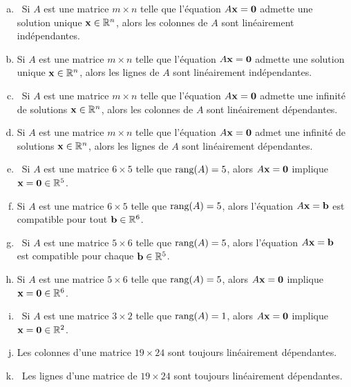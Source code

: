 \begin{prob}
\begin{enumerate}[a)]
\item\sov~Si $A$ est une matrice $m \times n$ telle que l'équation $A\mathbf{x}=\mathbf{0}$ admette une solution unique $\mathbf{x}\in \mathbb{R}^n$, alors les colonnes de $A$ sont linéairement indépendantes.
 
\medskip
\item Si $A$ est une matrice $m \times n$ telle que l'équation $A\mathbf{x}=\mathbf{0}$ admette une solution unique $\mathbf{x}\in \mathbb{R}^n$, alors les lignes de $A$ sont linéairement indépendantes.
\medskip

 
\item\sov~Si $A$ est une matrice $m \times n$ telle que l'équation $A\mathbf{x}=\mathbf{0}$ admette une infinité de solutions $\mathbf{x}\in \mathbb{R}^n$, alors les colonnes de $A$ sont linéairement dépendantes.
 
\medskip
\item Si $A$ est une matrice $m \times n$ telle que l'équation $A\mathbf{x}=\mathbf{0}$ admet une infinité de solutions $\mathbf{x}\in \mathbb{R}^n$, alors les lignes de $A$ sont linéairement dépendantes.
 
\medskip
\item\sov~Si $A$ est une matrice $6 \times 5$ telle que $\textrm{rang}(A)=5$, alors $A\mathbf{x}=\mathbf{0}$ implique $\mathbf{x}=\mathbf{0}\in \mathbb{R}^5$.
\medskip
 
\item Si $A$ est une matrice $6 \times 5$ telle que $\textrm{rang}(A)=5$, alors l'équation $A\mathbf{x}=\mathbf{b}$ est compatible pour tout $\mathbf{b} \in \mathbb{R}^6$.
\medskip
 
\item\sov~Si $A$ est une matrice $5 \times 6$ telle que $\textrm{rang}(A)=5$, alors l'équation $A\mathbf{x}=\mathbf{b}$ est compatible pour chaque $\mathbf{b}\in \mathbb{R}^5$.
\medskip
 
\item Si $A$ est une matrice $ 5 \times 6$ telle que $\textrm{rang}(A)=5$, alors $A\mathbf{x}=\mathbf{0}$ implique $\mathbf{x}=\mathbf{0}\in \mathbb{R}^6$.
\medskip
 
\item\sov~Si $A$ est une matrice $3 \times 2$ telle que $\textrm{rang}(A)=1$, alors $A\mathbf{x}=\mathbf{0}$ implique $\mathbf{x}=\mathbf{0}\in \mathbb{R}^2$.
\medskip
 
\item Les colonnes d'une matrice $19\times 24$ sont toujours linéairement dépendantes.
\medskip
 
\item\sov~Les lignes d'une matrice de $19 \times 24$ sont toujours linéairement dépendantes.
\medskip
 
\end{enumerate}



\end{prob}

